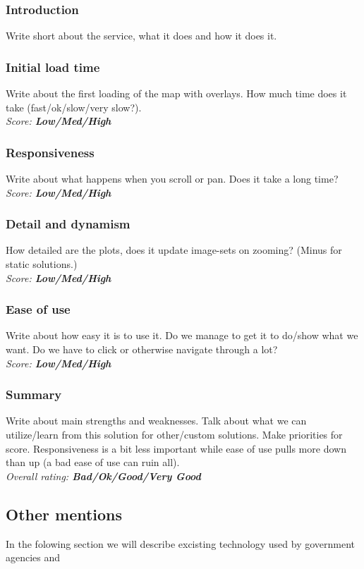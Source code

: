 \documentclass[11pt,a4paper,titlepage,oneside]{report}
\begin{document}
\subsubsection{Introduction}
Write short about the service, what it does and how it does it.
\subsubsection{Initial load time}
Write about the first loading of the map with overlays. How much time does it take (fast/ok/slow/very slow?).
\\ \emph{Score: \textbf{Low/Med/High}}
\subsubsection{Responsiveness}
Write about what happens when you scroll or pan. Does it take a long time?
\\ \emph{Score: \textbf{Low/Med/High}}
\subsubsection{Detail and dynamism}
How detailed are the plots, does it update image-sets on zooming? (Minus for static solutions.) 
\\ \emph{Score: \textbf{Low/Med/High}}
\subsubsection{Ease of use}
Write about how easy it is to use it. Do we manage to get it to do/show what we want. Do we have to click or otherwise navigate through a lot?
\\ \emph{Score: \textbf{Low/Med/High}}
\subsubsection{Summary}
Write about main strengths and weaknesses. Talk about what we can utilize/learn from this solution for other/custom solutions. Make priorities for score. Responsiveness is a bit less important while ease of use pulls more down than up (a bad ease of use can ruin all).
\\ \emph{Overall rating: \textbf{Bad/Ok/Good/Very Good}}

\subsection{Other mentions}
In the folowing section we will describe excisting technology used by government agencies and
\end{document}
